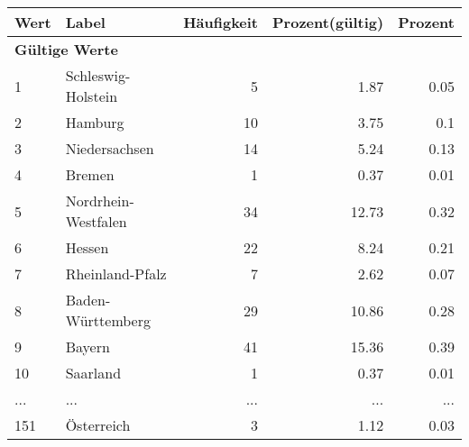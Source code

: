      \begin{longtable}{lXrrr}
     \toprule
     \textbf{Wert} & \textbf{Label} & \textbf{Häufigkeit} & \textbf{Prozent(gültig)} & \textbf{Prozent} \\
     \endhead
     \midrule
     \multicolumn{5}{l}{\textbf{Gültige Werte}}\\
        1 & \multicolumn{1}{X}{Schleswig-Holstein} & %
          \num{5} &
          \num[round-mode=places,round-precision=2]{1.87} &
          \num[round-mode=places,round-precision=2]{0.05} \\
        2 & \multicolumn{1}{X}{Hamburg} & %
          \num{10} &
          \num[round-mode=places,round-precision=2]{3.75} &
          \num[round-mode=places,round-precision=2]{0.1} \\
        3 & \multicolumn{1}{X}{Niedersachsen} & %
          \num{14} &
          \num[round-mode=places,round-precision=2]{5.24} &
          \num[round-mode=places,round-precision=2]{0.13} \\
        4 & \multicolumn{1}{X}{Bremen} & %
          \num{1} &
          \num[round-mode=places,round-precision=2]{0.37} &
          \num[round-mode=places,round-precision=2]{0.01} \\
        5 & \multicolumn{1}{X}{Nordrhein-Westfalen} & %
          \num{34} &
          \num[round-mode=places,round-precision=2]{12.73} &
          \num[round-mode=places,round-precision=2]{0.32} \\
        6 & \multicolumn{1}{X}{Hessen} & %
          \num{22} &
          \num[round-mode=places,round-precision=2]{8.24} &
          \num[round-mode=places,round-precision=2]{0.21} \\
        7 & \multicolumn{1}{X}{Rheinland-Pfalz} & %
          \num{7} &
          \num[round-mode=places,round-precision=2]{2.62} &
          \num[round-mode=places,round-precision=2]{0.07} \\
        8 & \multicolumn{1}{X}{Baden-Württemberg} & %
          \num{29} &
          \num[round-mode=places,round-precision=2]{10.86} &
          \num[round-mode=places,round-precision=2]{0.28} \\
        9 & \multicolumn{1}{X}{Bayern} & %
          \num{41} &
          \num[round-mode=places,round-precision=2]{15.36} &
          \num[round-mode=places,round-precision=2]{0.39} \\
        10 & \multicolumn{1}{X}{Saarland} & %
          \num{1} &
          \num[round-mode=places,round-precision=2]{0.37} &
          \num[round-mode=places,round-precision=2]{0.01} \\
       ... & ... & ... & ... & ... \\
        151 & \multicolumn{1}{X}{Österreich} & %
          \num{3} &
          \num[round-mode=places,round-precision=2]{1.12} &
          \num[round-mode=places,round-precision=2]{0.03} \\


\end{longtable}
